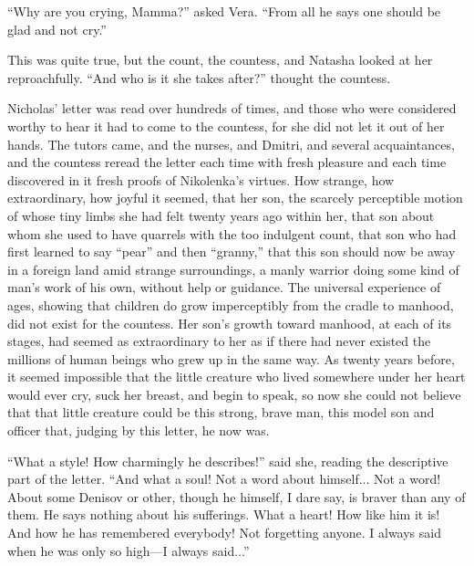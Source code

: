 ``Why are you crying, Mamma?'' asked Vera. ``From all he says one
should be glad and not cry.''

This was quite true, but the count, the countess, and Natasha
looked at her reproachfully. ``And who is it she takes after?''
thought the countess.

Nicholas' letter was read over hundreds of times, and those who
were considered worthy to hear it had to come to the countess,
for she did not let it out of her hands. The tutors came, and the
nurses, and Dmitri, and several acquaintances, and the countess
reread the letter each time with fresh pleasure and each time
discovered in it fresh proofs of Nikolenka's virtues. How
strange, how extraordinary, how joyful it seemed, that her son,
the scarcely perceptible motion of whose tiny limbs she had felt
twenty years ago within her, that son about whom she used to have
quarrels with the too indulgent count, that son who had first
learned to say ``pear'' and then ``granny,'' that this son should
now be away in a foreign land amid strange surroundings, a manly
warrior doing some kind of man's work of his own, without help or
guidance. The universal experience of ages, showing that children
do grow imperceptibly from the cradle to manhood, did not exist
for the countess. Her son's growth toward manhood, at each of its
stages, had seemed as extraordinary to her as if there had never
existed the millions of human beings who grew up in the same
way. As twenty years before, it seemed impossible that the little
creature who lived somewhere under her heart would ever cry, suck
her breast, and begin to speak, so now she could not believe that
that little creature could be this strong, brave man, this model
son and officer that, judging by this letter, he now was.

``What a style! How charmingly he describes!'' said she, reading
the descriptive part of the letter. ``And what a soul! Not a word
about himself... Not a word! About some Denisov or other, though
he himself, I dare say, is braver than any of them. He says
nothing about his sufferings. What a heart! How like him it is!
And how he has remembered everybody! Not forgetting anyone. I
always said when he was only so high---I always said...''

